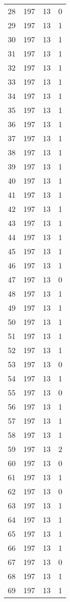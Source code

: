 \begin{longtable}[!]{c|ccc}
	28	& 197	& 13	& 0	\\
	29	& 197	& 13	& 1	\\
	30	& 197	& 13	& 1	\\
	31	& 197	& 13	& 1	\\
	32	& 197	& 13	& 1	\\
	33	& 197	& 13	& 1	\\
	34	& 197	& 13	& 1	\\
	35	& 197	& 13	& 1	\\
	36	& 197	& 13	& 1	\\
	37	& 197	& 13	& 1	\\
	38	& 197	& 13	& 1	\\
	39	& 197	& 13	& 1	\\
	40	& 197	& 13	& 1	\\
	41	& 197	& 13	& 1	\\
	42	& 197	& 13	& 1	\\
	43	& 197	& 13	& 1	\\
	44	& 197	& 13	& 1	\\
	45	& 197	& 13	& 1	\\
	46	& 197	& 13	& 1	\\
	47	& 197	& 13	& 0	\\
	48	& 197	& 13	& 1	\\
	49	& 197	& 13	& 1	\\
	50	& 197	& 13	& 1	\\
	51	& 197	& 13	& 1	\\
	52	& 197	& 13	& 1	\\
	53	& 197	& 13	& 0	\\
	54	& 197	& 13	& 1	\\
	55	& 197	& 13	& 0	\\
	56	& 197	& 13	& 1	\\
	57	& 197	& 13	& 1	\\
	58	& 197	& 13	& 1	\\
	59	& 197	& 13	& 2	\\
	60	& 197	& 13	& 0	\\
	61	& 197	& 13	& 1	\\
	62	& 197	& 13	& 0	\\
	63	& 197	& 13	& 1	\\
	64	& 197	& 13	& 1	\\
	65	& 197	& 13	& 1	\\
	66	& 197	& 13	& 1	\\
	67	& 197	& 13	& 0	\\
	68	& 197	& 13	& 1	\\
	69	& 197	& 13	& 1	\\

\end{longtable}
